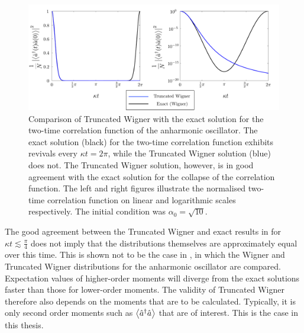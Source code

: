 \begin{figure}
    \centering
    \includegraphics[width=15cm]{TwoTimeTWComparison}
    \caption{
        Comparison of Truncated Wigner with the exact solution for the two-time correlation function of the anharmonic oscillator.  The exact solution (black) for the two-time correlation function exhibits revivals every $\kappa t = 2\pi$, while the Truncated Wigner solution (blue) does not.  The Truncated Wigner solution, however, is in good agreement with the exact solution for the collapse of the correlation function.  The left and right figures illustrate the normalised two-time correlation function on linear and logarithmic scales respectively.  The initial condition was $\alpha_0 = \sqrt{10}$. \label{BackgroundTheory:TwoTimeTWComparison}
    }
\end{figure}

The good agreement between the Truncated Wigner and exact results in  for $\kappa t \lesssim \frac{\pi}{4}$ does not imply that the distributions themselves are approximately equal over this time.  This is shown not to be the case in , in which the Wigner and Truncated Wigner distributions for the anharmonic oscillator are compared.  Expectation values of higher-order moments will diverge from the exact solutions faster than those for lower-order moments.  The validity of Truncated Wigner therefore also depends on the moments that are to be calculated.  Typically, it is only second order moments such as ${\big<\hat{a}^\dagger \hat{a}\big>}$ that are of interest. This is the case in this thesis.

